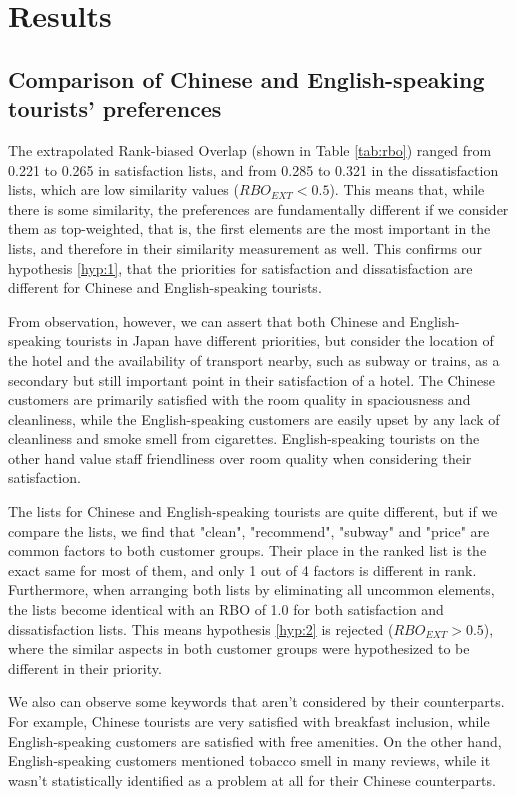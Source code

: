 \section{Results}\label{results}

\subsection{Comparison of Chinese and English-speaking tourists' preferences}

The extrapolated Rank-biased Overlap (shown in Table \ref{tab:rbo}) ranged from 0.221 to 0.265 in satisfaction lists, and from 0.285 to 0.321 in the dissatisfaction lists, which are low similarity values (\(RBO_{EXT} < 0.5\)). This means that, while there is some similarity, the preferences are fundamentally different if we consider them as top-weighted, that is, the first elements are the most important in the lists, and therefore in their similarity measurement as well. This confirms our hypothesis \ref{hyp:1}, that the priorities for satisfaction and dissatisfaction are different for Chinese and English-speaking tourists. 

From observation, however, we can assert that both Chinese and English-speaking tourists in Japan have different priorities, but consider the location of the hotel and the availability of transport nearby, such as subway or trains, as a secondary but still important point in their satisfaction of a hotel. The Chinese customers are primarily satisfied with the room quality in spaciousness and cleanliness, while the English-speaking customers are easily upset by any lack of cleanliness and smoke smell from cigarettes. English-speaking tourists on the other hand value staff friendliness over room quality when considering their satisfaction. 

The lists for Chinese and English-speaking tourists are quite different, but if we compare the lists, we find that "clean", "recommend", "subway" and "price" are common factors to both customer groups. Their place in the ranked list is the exact same for most of them, and only 1 out of 4 factors is different in rank. Furthermore, when arranging both lists by eliminating all uncommon elements, the lists become identical with an RBO of 1.0 for both satisfaction and dissatisfaction lists. This means hypothesis \ref{hyp:2} is rejected (\(RBO_{EXT} > 0.5\)), where the similar aspects in both customer groups were hypothesized to be different in their priority.

We also can observe some keywords that aren't considered by their counterparts. For example, Chinese tourists are very satisfied with breakfast inclusion, while English-speaking customers are satisfied with free amenities. On the other hand, English-speaking customers mentioned tobacco smell in many reviews, while it wasn't statistically identified as a problem at all for their Chinese counterparts.

